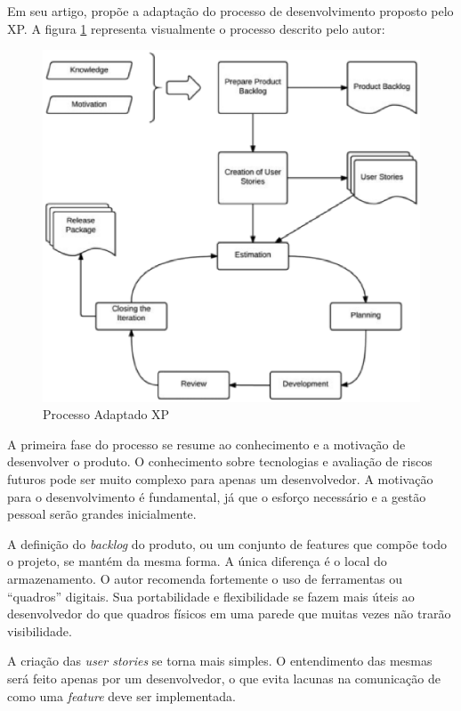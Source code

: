 Em seu artigo, \cite{Bernabe:2015} propõe a adaptação do processo de desenvolvimento proposto pelo XP. A figura \ref{fig04} representa visualmente o processo descrito pelo autor:

\begin{figure}[h]
	\centering
	\includegraphics[keepaspectratio=true,scale=0.6]{figuras/fig04.eps}
	\caption{Processo Adaptado XP \cite{Bernabe:2015}}
	\label{fig04}
\end{figure}

A primeira fase do processo se resume ao conhecimento e a motivação de desenvolver o produto. O conhecimento sobre tecnologias e avaliação de riscos futuros pode ser muito complexo para apenas um desenvolvedor. A motivação para o desenvolvimento é fundamental, já que o esforço necessário e a gestão pessoal serão grandes inicialmente. \cite{Bernabe:2015}

A definição do \textit{backlog} do produto, ou um conjunto de features que compõe todo o projeto, se mantém da mesma forma.  A única diferença é o local do armazenamento. O autor recomenda fortemente o uso de ferramentas ou “quadros” digitais. Sua portabilidade e flexibilidade se fazem mais úteis ao desenvolvedor do que quadros físicos em uma parede que muitas vezes não trarão visibilidade.

A criação das \textit{user stories} se torna mais simples. O entendimento das mesmas será feito apenas por um desenvolvedor, o que evita lacunas na comunicação de como uma \textit{feature} deve ser implementada.

